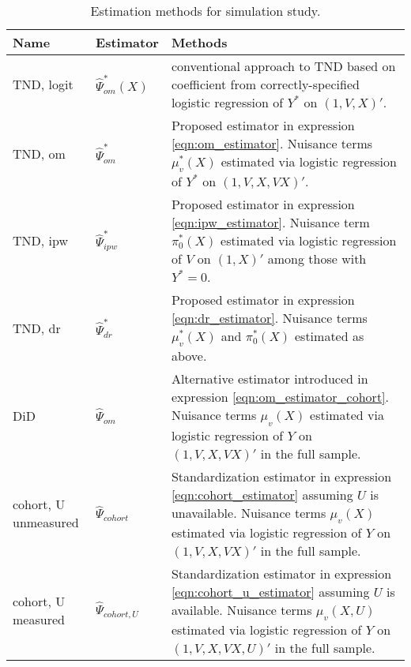 \begin{appendix}
\begin{refsection}
\begin{table}[p]
    \centering
    \caption{Estimation methods for simulation study.}\label{tab:methods}
    \begin{tabular}{llp{3in}}
        \toprule
        Name & Estimator & Methods \\
        \midrule
        TND, logit & $\widehat{\Psi}_{om}^*(X)$ & conventional approach to TND based on coefficient from correctly-specified logistic regression of $Y^*$ on $(1, V, X)'$. \\
        \addlinespace[1em]
        TND, om & $\widehat{\Psi}^*_{om}$ & Proposed estimator in expression \ref{eqn:om_estimator}. Nuisance terms $\mu_v^*(X)$ estimated via logistic regression of $Y^*$ on $(1, V, X, VX)'$.  \\
        \addlinespace[1em]
        TND, ipw & $\widehat{\Psi}^*_{ipw}$ & Proposed estimator in expression \ref{eqn:ipw_estimator}. Nuisance term $\pi_0^*(X)$ estimated via logistic regression of $V$ on $(1, X)'$ among those with $Y^*=0$. \\
        \addlinespace[1em]
        TND, dr & $\widehat{\Psi}^*_{dr}$ & Proposed estimator in expression \ref{eqn:dr_estimator}. Nuisance terms $\mu_v^*(X)$ and $\pi_0^*(X)$ estimated as above. \\
        \addlinespace[1em]
        DiD & $\widehat{\Psi}_{om}$ &  Alternative estimator introduced in expression \ref{eqn:om_estimator_cohort}. Nuisance terms $\mu_v(X)$ estimated via logistic regression of $Y$ on $(1, V, X, VX)'$ in the full sample. \\
        \addlinespace[1em]
        cohort, U unmeasured & $\widehat{\Psi}_{cohort}$ & Standardization estimator in expression \ref{eqn:cohort_estimator} assuming $U$ is unavailable. Nuisance terms $\mu_v(X)$ estimated via logistic regression of $Y$ on $(1, V, X, VX)'$ in the full sample. \\ 
        \addlinespace[1em]
        cohort, U measured & $\widehat{\Psi}_{cohort,U}$ & Standardization estimator in expression \ref{eqn:cohort_u_estimator} assuming $U$ is available. Nuisance terms $\mu_v(X,U)$ estimated via logistic regression of $Y$ on $(1, V, X, VX, U)'$ in the full sample. \\ 
        \bottomrule
    \end{tabular}
\end{table}

\newcommand*{\TableHead}[1]{\multicolumn{1}{p{3em}}{\centering\hskip0pt#1}}
\newcommand*{\TableHeadd}[1]{\multicolumn{1}{p{4em}}{\centering\hskip0pt#1}}
\newcommand*{\TableHeaddd}[1]{\multicolumn{1}{p{7em}}{\centering\hskip0pt#1}}


\end{refsection}
\end{appendix}
